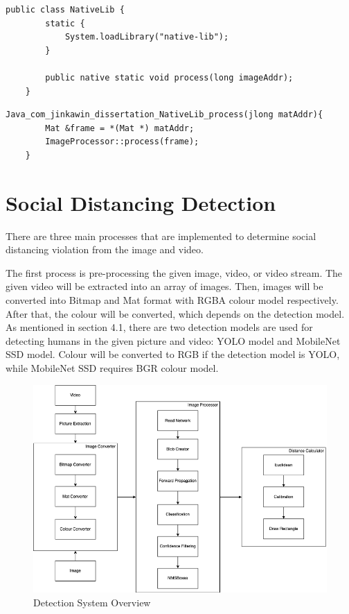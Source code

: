 \begin{lstlisting}[caption={Java Native Function},captionpos=b]
    public class NativeLib {
        static {
            System.loadLibrary("native-lib");
        }

        public native static void process(long imageAddr);
    }
\end{lstlisting}

\begin{lstlisting}[caption={C++ JNI Method},captionpos=b]
    Java_com_jinkawin_dissertation_NativeLib_process(jlong matAddr){
        Mat &frame = *(Mat *) matAddr;
        ImageProcessor::process(frame);
    }
\end{lstlisting}

    \section{Social Distancing Detection}
        There are three main processes that are implemented to determine social distancing violation from the image and video.

        The first process is pre-processing the given image, video, or video stream.
        The given video will be extracted into an array of images.
        Then, images will be converted into Bitmap and Mat format with RGBA colour model respectively.
        After that, the colour will be converted, which depends on the detection model.
        As mentioned in section 4.1, there are two detection models are used for detecting humans in the given picture and video: YOLO model and MobileNet SSD model.
        Colour will be converted to RGB if the detection model is YOLO,
        while MobileNet SSD requires BGR colour model.

        \begin{figure}[!ht]
            \centering
            \includegraphics[width=5in]{images/chapter3/system-overview.png}
            \caption{Detection System Overview}
            \label{systemOverview}
        \end{figure}

